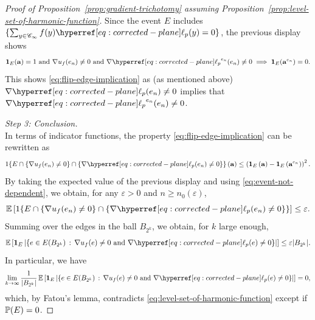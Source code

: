 \documentclass[12pt]{amsart}
\numberwithin{equation}{section}
\begin{document}
\begin{proof}[Proof of Proposition~\ref{prop:gradient-trichotomy} assuming Proposition~\ref{prop:level-set-of-harmonic-function}]
		Since the event $E$ includes $\{ \sum_{y \in \mathscr{C}_\infty} f(y) \ellp{p}(y)  = 0 \} $, the previous display shows
		\[
		\indc_{E}(\mathbf{a}) = 1 ~\mbox{and}~ \nabla u_f(e_n) \neq 0 ~\mbox{and}~  \nabla {\ellp{p}}^{e_n}(e_n) \neq 0 \implies \indc_{E}(\mathbf{a}^{e_n}) = 0.
		\]
		This shows \eqref{eq:flip-edge-implication} as (as mentioned above) $\nabla \ellp{p}(e_n) \neq 0$ implies that $\nabla {\ellp{p}}^{e_n}(e_n) \neq 0$. 
		\medskip
		
		
		
		{\it Step 3: Conclusion.} \\
		In terms of indicator functions, the property \eqref{eq:flip-edge-implication} can be rewritten as 
		\begin{equation*}
			1\{E \cap \left\{ \nabla u_f(e_n) \neq 0 \right\}\cap \left\{ \nabla \ellp{p}(e_n) \neq 0 \right\}\}  \left( \mathbf{a} \right) \leq  \left( \indc_{E} \left( \mathbf{a} \right) -  \indc_{E} \left( \mathbf{a}^{e_n} \right) \right)^2.
		\end{equation*}
		By taking the expected value of the previous display and using \eqref{eq:event-not-dependent}, we obtain, for any $\varepsilon > 0$ and $n \geq n_0(\varepsilon)$,
		\begin{equation*}
			\E \left[ 1\{E \cap \left\{ \nabla u_f(e_n) \neq 0 \right\}\cap \left\{ \nabla \ellp{p} (e_n) \neq 0 \right\}\} \right] \leq  \varepsilon.
		\end{equation*}
		Summing over the edges in the ball $B_{2^k}$, we obtain, for $k$ large enough,
		\begin{equation*}
			\E \left[ \indc_{E}\left| \left\{ e \in E(B_{2^k}) \, : \, \nabla u_f(e) \neq 0 ~\mbox{and}~ \nabla \ellp{p}(e) \neq 0 \right\} \right|  \right] \leq \varepsilon  |B_{2^k} | .
		\end{equation*}
		In particular, we have
		\begin{equation} \label{eq:no-sensitive-edges}
			\lim_{k \to \infty} \frac{1}{|B_{2^k}|}  \E \left[ \indc_{E} \left| \left\{ e \in E(B_{2^k}) \, : \, \nabla u_f(e) \neq 0 ~\mbox{and}~ \nabla \ellp{p}(e) \neq 0 \right\} \right|  \right] = 0,
		\end{equation}
		which, by Fatou's lemma, contradicts \eqref{eq:level-set-of-harmonic-function} except if $\P(E) = 0$. \end{proof}
	
	
	
	
	
	
	
	
	
\end{document}
